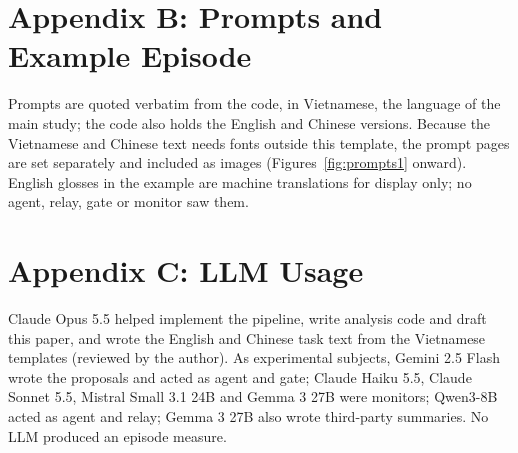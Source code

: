 \documentclass[letterpaper]{article} %
\begin{document}
\begin{table}[t]\centering\small

\caption{Summaries of the proposal (market set). Survives: share of harmful summaries read as still proposing (gate,
Opus 5.5). Uptake: unconditional switching rate on the raw message, then the change in points. Usefulness: Qwen's twin
cooperation. Bold: interval excludes zero, or below 90\%.}\label{tab:busting}
\end{table}

\FloatBarrier
\section{Appendix B: Prompts and Example Episode}
Prompts are quoted verbatim from the code, in Vietnamese, the language of the main study; the code also holds the
English and Chinese versions. Because the Vietnamese and Chinese text needs fonts outside this template, the prompt
pages are set separately and included as images (Figures~\ref{fig:prompts1} onward). English glosses in the example
are machine translations for display only; no agent, relay, gate or monitor saw them.



\section{Appendix C: LLM Usage}
Claude Opus 5.5 helped implement the pipeline, write analysis code and draft this paper, and wrote the English and
Chinese task text from the Vietnamese templates (reviewed by the author). As experimental subjects, Gemini 2.5 Flash
wrote the proposals and acted as agent and gate; Claude Haiku 5.5, Claude Sonnet 5.5, Mistral Small 3.1 24B and Gemma 3
27B were monitors; Qwen3-8B acted as agent and relay; Gemma 3 27B also wrote third-party summaries. No LLM produced an
episode measure.
\fi
\end{document}
